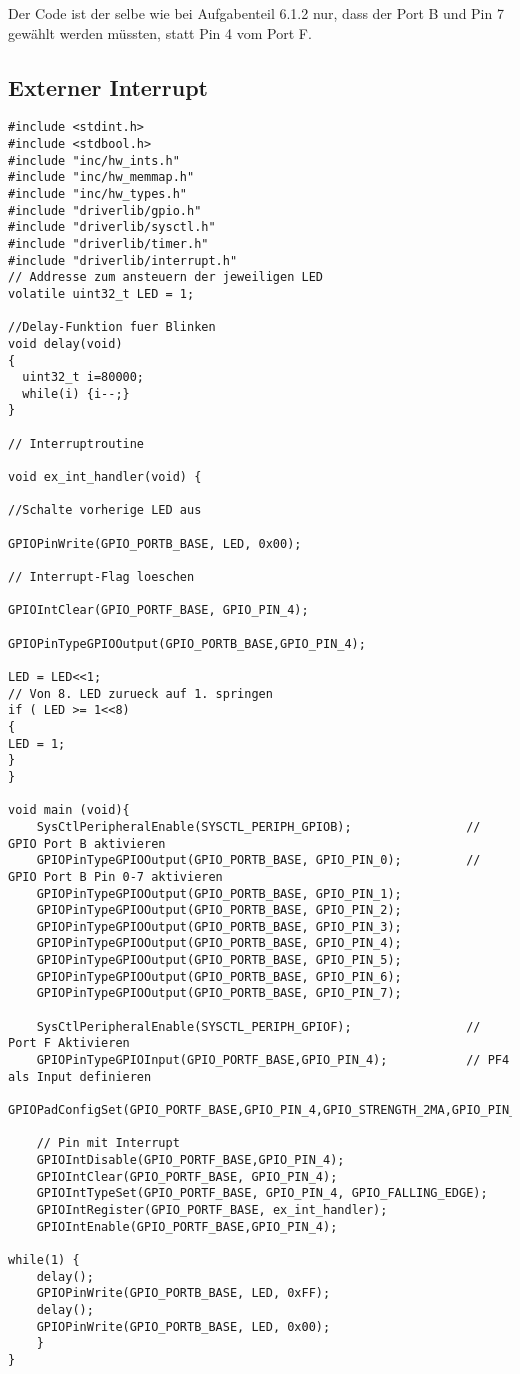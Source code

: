 \subsubsection{}
Der Code ist der selbe wie bei Aufgabenteil 6.1.2 nur, dass der Port B und Pin 7 gewählt werden müssten, statt Pin 4 vom Port F.
 
 
\subsection{Externer Interrupt}
\begin{lstlisting}
#include <stdint.h>
#include <stdbool.h>
#include "inc/hw_ints.h"
#include "inc/hw_memmap.h"
#include "inc/hw_types.h"
#include "driverlib/gpio.h"
#include "driverlib/sysctl.h"
#include "driverlib/timer.h"
#include "driverlib/interrupt.h"
// Addresse zum ansteuern der jeweiligen LED
volatile uint32_t LED = 1;

//Delay-Funktion fuer Blinken
void delay(void)
{
  uint32_t i=80000;
  while(i) {i--;}
}

// Interruptroutine

void ex_int_handler(void) {

//Schalte vorherige LED aus

GPIOPinWrite(GPIO_PORTB_BASE, LED, 0x00);

// Interrupt-Flag loeschen

GPIOIntClear(GPIO_PORTF_BASE, GPIO_PIN_4);

GPIOPinTypeGPIOOutput(GPIO_PORTB_BASE,GPIO_PIN_4);

LED = LED<<1;
// Von 8. LED zurueck auf 1. springen
if ( LED >= 1<<8)
{
LED = 1;
}
}

void main (void){
    SysCtlPeripheralEnable(SYSCTL_PERIPH_GPIOB);                // GPIO Port B aktivieren
    GPIOPinTypeGPIOOutput(GPIO_PORTB_BASE, GPIO_PIN_0);         // GPIO Port B Pin 0-7 aktivieren
    GPIOPinTypeGPIOOutput(GPIO_PORTB_BASE, GPIO_PIN_1);
    GPIOPinTypeGPIOOutput(GPIO_PORTB_BASE, GPIO_PIN_2);
    GPIOPinTypeGPIOOutput(GPIO_PORTB_BASE, GPIO_PIN_3);
    GPIOPinTypeGPIOOutput(GPIO_PORTB_BASE, GPIO_PIN_4);
    GPIOPinTypeGPIOOutput(GPIO_PORTB_BASE, GPIO_PIN_5);
    GPIOPinTypeGPIOOutput(GPIO_PORTB_BASE, GPIO_PIN_6);
    GPIOPinTypeGPIOOutput(GPIO_PORTB_BASE, GPIO_PIN_7);

    SysCtlPeripheralEnable(SYSCTL_PERIPH_GPIOF);                // Port F Aktivieren
    GPIOPinTypeGPIOInput(GPIO_PORTF_BASE,GPIO_PIN_4);           // PF4 als Input definieren
    GPIOPadConfigSet(GPIO_PORTF_BASE,GPIO_PIN_4,GPIO_STRENGTH_2MA,GPIO_PIN_TYPE_STD_WPU);

    // Pin mit Interrupt
    GPIOIntDisable(GPIO_PORTF_BASE,GPIO_PIN_4);
    GPIOIntClear(GPIO_PORTF_BASE, GPIO_PIN_4);
    GPIOIntTypeSet(GPIO_PORTF_BASE, GPIO_PIN_4, GPIO_FALLING_EDGE);
    GPIOIntRegister(GPIO_PORTF_BASE, ex_int_handler);
    GPIOIntEnable(GPIO_PORTF_BASE,GPIO_PIN_4);

while(1) {
    delay();
    GPIOPinWrite(GPIO_PORTB_BASE, LED, 0xFF);
    delay();
    GPIOPinWrite(GPIO_PORTB_BASE, LED, 0x00);
	}
}

\end{lstlisting}